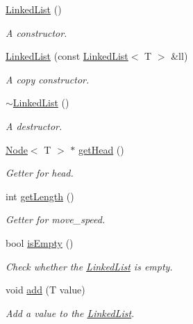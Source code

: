 \begin{DoxyCompactItemize}
\item 
\mbox{\hyperlink{class_linked_list_a3c20fcfec867e867f541061a09fc640c}{Linked\+List}} ()
\begin{DoxyCompactList}\small\item\em A constructor. \end{DoxyCompactList}\item 
\mbox{\hyperlink{class_linked_list_a2e41045167e4cd25820ae2ed7cb74938}{Linked\+List}} (const \mbox{\hyperlink{class_linked_list}{Linked\+List}}$<$ T $>$ \&ll)
\begin{DoxyCompactList}\small\item\em A copy constructor. \end{DoxyCompactList}\item 
\mbox{\hyperlink{class_linked_list_a7c37609df3b83bc4eb0281b852f93fd7}{$\sim$\+Linked\+List}} ()
\begin{DoxyCompactList}\small\item\em A destructor. \end{DoxyCompactList}\item 
\mbox{\hyperlink{class_node}{Node}}$<$ T $>$ $\ast$ \mbox{\hyperlink{class_linked_list_aa4614ce35a543b74afb3c5bff8b018d4}{get\+Head}} ()
\begin{DoxyCompactList}\small\item\em Getter for head. \end{DoxyCompactList}\item 
int \mbox{\hyperlink{class_linked_list_ac650bde26cf5b3c074e2d59f97e0ff3b}{get\+Length}} ()
\begin{DoxyCompactList}\small\item\em Getter for move\+\_\+speed. \end{DoxyCompactList}\item 
bool \mbox{\hyperlink{class_linked_list_a7ecbb28e82117a680839ed0dc28ebdce}{is\+Empty}} ()
\begin{DoxyCompactList}\small\item\em Check whether the \mbox{\hyperlink{class_linked_list}{Linked\+List}} is empty. \end{DoxyCompactList}\item 
void \mbox{\hyperlink{class_linked_list_a188425c092c410b45ab70a3d396aff67}{add}} (T value)
\begin{DoxyCompactList}\small\item\em Add a value to the \mbox{\hyperlink{class_linked_list}{Linked\+List}}. \end{DoxyCompactList}\item 

\end{DoxyCompactItemize}
